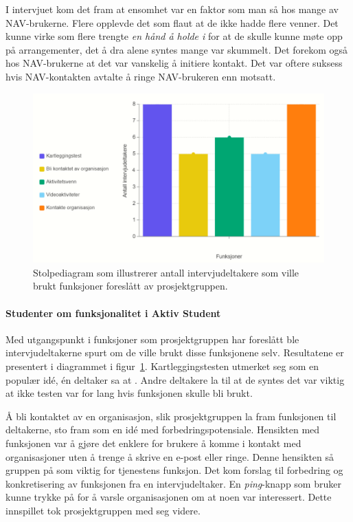 \vspace{5mm} %

I intervjuet kom det fram at ensomhet var en faktor som man så hos mange av NAV-brukerne. Flere opplevde det som flaut at de ikke hadde flere venner. Det kunne virke som flere trengte {\em  en hånd å holde i} for at de skulle kunne møte opp på arrangementer, det å dra alene syntes mange var skummelt. Det forekom også hos NAV-brukerne at det var vanskelig å initiere kontakt. Det var oftere suksess hvis NAV-kontakten avtalte å ringe NAV-brukeren enn motsatt.


\begin{figure}[H]
\includegraphics[width=\textwidth]{Illustrasjoner/diagram-funksjoner.png}
\caption{Stolpediagram som illustrerer antall intervjudeltakere som ville brukt funksjoner foreslått av prosjektgruppen.}
\label{fig:diagram-funksjoner}
\end{figure}

\paragraph{Studenter om funksjonalitet i Aktiv Student}

Med utgangspunkt i funksjoner som prosjektgruppen har foreslått ble intervjudeltakerne spurt om de ville brukt disse funksjonene selv. Resultatene er presentert i diagrammet i figur~\ref{fig:diagram-funksjoner}. Kartleggingstesten utmerket seg som en populær idé, én deltaker sa at . Andre deltakere la til at de syntes det var viktig at ikke testen var for lang hvis funksjonen skulle bli brukt.

Å bli kontaktet av en organisasjon, slik prosjektgruppen la fram funksjonen til deltakerne, sto fram som en idé med forbedringspotensiale. Hensikten med funksjonen var å gjøre det enklere for brukere å komme i kontakt med organisasjoner uten å trenge å skrive en e-post eller ringe. Denne hensikten så gruppen på som viktig for tjenestens funksjon. Det kom forslag til forbedring og konkretisering av funksjonen fra en intervjudeltaker. En {\em  ping}-knapp som bruker kunne trykke på for å varsle organisasjonen om at noen var interessert. Dette innspillet tok prosjektgruppen med seg videre.

